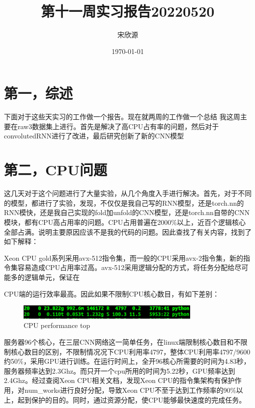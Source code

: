 \documentclass[11pt]{ctexart}
\begin{document}
\title{第十一周实习报告20220520}
\author{宋欣源}
\date{\today}

\maketitle %


\section{第一，综述}

下面对于这些天实习的工作做一个报告。现在就两周的工作做一个总结
我这周主要在raw3数据集上进行。首先是解决了高CPU占有率的问题，然后对于convolutedRNN进行了改进，最后研究创新了新的CNN模型

\section{第二，CPU问题}
这几天对于这个问题进行了大量实验，从几个角度入手进行解决。首先，对于不同的模型，都进行了实验，发现，不仅仅是我自己写的RNN模型，还是torch.nn的RNN模快，还是我自己实现的fold加unfold的CNN模型，还是torch.nn自带的CNN模块，都有CPU高占用率的问题。CPU占用普遍在2000\%以上，近百个逻辑核心全部占满。说明主要原因应该不是我的代码的问题。因此查找了有关内容，找到了如下解释：

Xeon CPU gold系列采用avx-512指令集，而一般的CPU采用avx-2指令集，新的指令集容易造成CPU占用率过高。avx-512采用逻辑分配的方式，将任务分配给尽可能多的逻辑单元，保证在 \par CPU端的运行效率最高。因此如果不限制CPU核心数目，有如下差别：

\begin{figure}[H]
\begin{center}
\includegraphics[width=0.8\textwidth]{1.PNG}
\end{center}
\caption{CPU performance top}
\label{FIG.1}
\end{figure}
服务器96个核心，在三层CNN网络这一简单任务，在linux端限制核心数目和不限制核心数目的区别，不限制情况况下CPU利用率4797，整体CPU利用率4797/9600约50\%，采用GPU进行训练。在运行时间上，全开96核心所需要的时间为4.83秒，服务器频率达到2.3Ghz。而只开一个cpu所用的时间为5.22秒，GPU频率达到2.4Ghz。经过查阅Xeon CPU相关文档，发现Xeon CPU的指令集架构有保护作用，对num\_works进行良好分配，导致Xeon CPU不至于达到工作频率的90\%以上，起到保护的目的。同时，通过资源分配，使CPU能够最快速度的完成任务。
\end{document}
